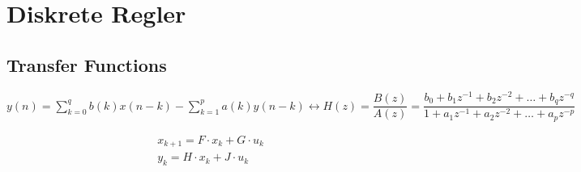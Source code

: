 \section{Diskrete Regler}


\subsection{Transfer Functions}
$ y(n) = \sum\limits_{k=0}^{q} b(k)x(n-k) - \sum\limits_{k=1}^{p} a(k)y(n-k) \longleftrightarrow 
  H(z) = \dfrac{B(z)}{A(z)} = \dfrac{b_0 + b_1z^{-1} + b_2 z^{-2} + \dots +
      b_q z^{-q}}{1 + a_1z^{-1} + a_2 z^{-2} + \dots + a_p z^{-p}} $

\begin{eqnarray*}
x_{k+1}=F \cdot x_k + G \cdot u_k \\
y_k = H \cdot x_k + J \cdot u_k
\end{eqnarray*}      
